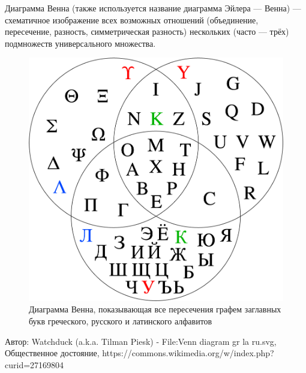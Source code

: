 \documentclass{beamer}
\begin{document}
\begin{frame}
Диаграмма Венна (также используется название диаграмма Эйлера — Венна) — схематичное изображение всех возможных отношений (объединение, пересечение, разность, симметрическая разность) нескольких (часто — трёх) подмножеств универсального множества.
\begin{figure}[h]
\centering
\includegraphics[scale=0.2]{images/venn_diagram.png}
\caption{Диаграмма Венна, показывающая все пересечения графем заглавных букв греческого, русского и латинского алфавитов}
\label{pic-venn}
\end{figure}
Автор: Watchduck (a.k.a. Tilman Piesk) - File:Venn diagram gr la ru.svg, Общественное достояние, https://commons.wikimedia.org/w/index.php?curid=27169804
\end{frame}
\end{document}
